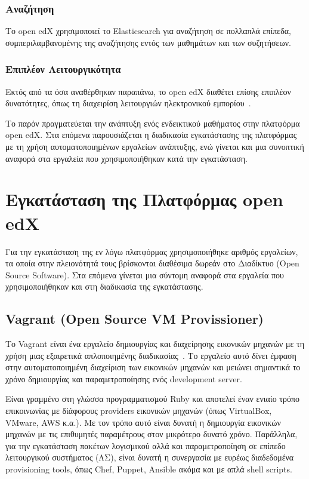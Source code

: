 \documentclass[12pt]{report}
\begin{document}
\subsection{Αναζήτηση}
Το \textlatin{open edX} χρησιμοποιεί το \textlatin{Elasticsearch} για αναζήτηση σε πολλαπλά επίπεδα, συμπεριλαμβανομένης της αναζήτησης εντός των μαθημάτων και των συζητήσεων.

\subsection{Επιπλέον Λειτουργικότητα}
Εκτός από τα όσα αναθέρθηκαν παραπάνω, το \textlatin{open edX} διαθέτει επίσης επιπλέον δυνατότητες, όπως τη διαχειρίση λειτουργιών ηλεκτρονικού εμπορίου~\cite{edx_arch}.

Το παρόν πραγματεύεται την ανάπτυξη ενός ενδεικτικού μαθήματος στην πλατφόρμα \textlatin{open edX}. Στα επόμενα παρουσιάζεται η διαδικασία εγκατάστασης της πλατφόρμας με τη χρήση αυτοματοποιημένων εργαλείων ανάπτυξης, ενώ γίνεται και μια συνοπτική αναφορά στα εργαλεία που χρησιμοποιήθηκαν κατά την εγκατάσταση.

\chapter{Εγκατάσταση της Πλατφόρμας \textlatin{open edX}}\label{ch3}
Για την εγκατάσταση της εν λόγω πλατφόρμας χρησιμοποιήθηκε αριθμός εργαλείων, τα οποία στην πλειονότητά τους βρίσκονται διαθέσιμα δωρεάν στο Διαδίκτυο (\textlatin{Open Source Software}). Στα επόμενα γίνεται μια σύντομη αναφορά στα εργαλεία που χρησιμοποιήθηκαν και στη διαδικασία της εγκατάστασης.

\section{\textlatin{\textlatin{Vagrant (Open Source VM Provissioner)}}}\label{vagrant}
Το \textlatin{Vagrant} είναι ένα εργαλείο δημιουργίας και διαχείρησης εικονικών μηχανών με τη χρήση μιας εξαιρετικά απλοποιημένης διαδικασίας~\cite{vagrant_by_hashicorp}. Το εργαλείο αυτό δίνει έμφαση στην αυτοματοποιημένη διαχείριση των εικονικών μηχανών και μειώνει σημαντικά το χρόνο δημιουργίας και παραμετροποίησης ενός \textlatin{development server}.

Είναι γραμμένο στη γλώσσα προγραμματισμού \textlatin{Ruby} και αποτελεί έναν ενιαίο τρόπο επικοινωνίας με δίάφορους \textlatin{providers} εικονικών μηχανών (όπως \textlatin{VirtualBox, VMware, AWS} κ.α.). Με τον τρόπο αυτό είναι δυνατή η δημιουργία εικονικών μηχανών με τις επιθυμητές παραμέτρους στον μικρότερο δυνατό χρόνο. Παράλληλα, για την εγκατάσταση πακέτων λογισμικού αλλά και παραμετροποίηση σε επίπεδο λειτουργικού συστήματος (ΛΣ), είναι δυνατή η συνεργασία με ευρέως διαδεδομένα \textlatin{provisioning tools}, όπως \textlatin{Chef, Puppet, Ansible} ακόμα και με απλά \textlatin{shell scripts}.
\end{document}
